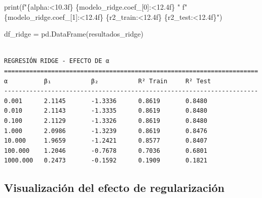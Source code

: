 \documentclass[
  doc,
  floatsintext,
  longtable,
  a4paper,
  nolmodern,
  notxfonts,
  notimes,
  12pt,
  colorlinks=true,linkcolor=blue,citecolor=blue,urlcolor=blue]{apa7}
\newenvironment{Shaded}{\begin{snugshade}}{\end{snugshade}}
\newcommand{\BuiltInTok}[1]{\textcolor[rgb]{0.00,0.23,0.31}{#1}}
\newcommand{\DecValTok}[1]{\textcolor[rgb]{0.68,0.00,0.00}{#1}}
\newcommand{\NormalTok}[1]{\textcolor[rgb]{0.00,0.23,0.31}{#1}}
\newcommand{\OperatorTok}[1]{\textcolor[rgb]{0.37,0.37,0.37}{#1}}
\newcommand{\SpecialCharTok}[1]{\textcolor[rgb]{0.37,0.37,0.37}{#1}}
\newcommand{\SpecialStringTok}[1]{\textcolor[rgb]{0.13,0.47,0.30}{#1}}
\begin{document}
\begin{Shaded}
\begin{Highlighting}[]
    \BuiltInTok{print}\NormalTok{(}\SpecialStringTok{f"}\SpecialCharTok{\{}\NormalTok{alpha}\SpecialCharTok{:\textless{}10.3f\}}\SpecialStringTok{ }\SpecialCharTok{\{}\NormalTok{modelo\_ridge}\SpecialCharTok{.}\NormalTok{coef\_[}\DecValTok{0}\NormalTok{]}\SpecialCharTok{:\textless{}12.4f\}}\SpecialStringTok{ "}
          \SpecialStringTok{f"}\SpecialCharTok{\{}\NormalTok{modelo\_ridge}\SpecialCharTok{.}\NormalTok{coef\_[}\DecValTok{1}\NormalTok{]}\SpecialCharTok{:\textless{}12.4f\}}\SpecialStringTok{ }\SpecialCharTok{\{}\NormalTok{r2\_train}\SpecialCharTok{:\textless{}12.4f\}}\SpecialStringTok{ }\SpecialCharTok{\{}\NormalTok{r2\_test}\SpecialCharTok{:\textless{}12.4f\}}\SpecialStringTok{"}\NormalTok{)}

\NormalTok{df\_ridge }\OperatorTok{=}\NormalTok{ pd.DataFrame(resultados\_ridge)}
\end{Highlighting}
\end{Shaded}

\begin{verbatim}

REGRESIÓN RIDGE - EFECTO DE α
======================================================================
α          β₁           β₂           R² Train     R² Test     
----------------------------------------------------------------------
0.001      2.1145       -1.3336      0.8619       0.8480      
0.010      2.1143       -1.3335      0.8619       0.8480      
0.100      2.1129       -1.3326      0.8619       0.8480      
1.000      2.0986       -1.3239      0.8619       0.8476      
10.000     1.9659       -1.2421      0.8577       0.8407      
100.000    1.2046       -0.7678      0.7036       0.6801      
1000.000   0.2473       -0.1592      0.1909       0.1821      
\end{verbatim}

\subsection{Visualización del efecto de
regularización}\label{visualizaciuxf3n-del-efecto-de-regularizaciuxf3n}
\end{document}
